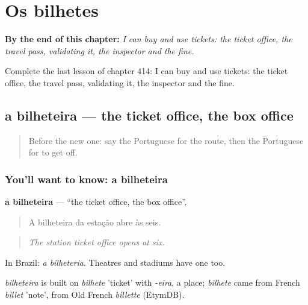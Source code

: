 
\chapter{Os bilhetes}
\label{ch:pt-os-bilhetes}

\begin{chapteropening}
\textbf{By the end of this chapter:} \emph{I can buy and use tickets: the ticket office, the travel pass, validating it, the inspector and the fine.}

Complete the last lesson of chapter 414: I can buy and use tickets: the ticket office, the travel pass, validating it, the inspector and the fine.
\end{chapteropening}

\section[a bilheteira]{a bilheteira — the ticket office, the box office}

\label{lesson:PT-C414-bilheteira}



\begin{quote}
Before the new one: say the Portuguese for the route, then the Portuguese for to get off.
\end{quote}

\subsection*{You'll want to know: a bilheteira}
\textbf{a bilheteira} — \textquotedblleft{}the ticket office, the box office\textquotedblright{}.

\begin{quote}
A bilheteira da estação abre às seis.
\end{quote}

\begin{quote}
\emph{The station ticket office opens at six.}
\end{quote}

In Brazil: \emph{a bilheteria}. Theatres and stadiums have one too.

\begin{cousinweb}
\emph{bilheteira} is built on \emph{bilhete} 'ticket' with \emph{-eira}, a place; \emph{bilhete} came from French \emph{billet} 'note', from Old French \emph{billette} (EtymDB).
\end{cousinweb}

